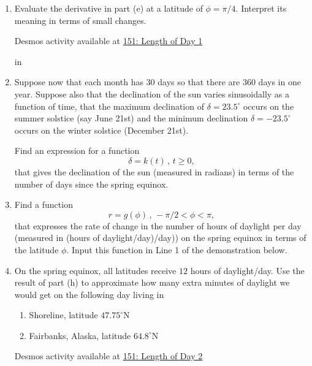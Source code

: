 \documentclass{ximera}
\newcommand{\pskip}{\vskip 0.1 in}
\begin{document}
\begin{question}
\begin{enumerate}
\item Evaluate the derivative in part (e) at a latitude of $\phi =\pi/4$. Interpret its meaning in terms of small changes.

\begin{onlineOnly}
    \begin{center}
\end{center}
\end{onlineOnly}

Desmos activity available at \href{https://www.desmos.com/calculator/ifomatkcta}{151: Length of Day 1}

\pskip 

\item Suppose now that each month has 30 days so that there are 360 days in one year. Suppose also that the declination of the sun varies sinusoidally as a function of time, that the maximum declination of $\delta = 23.5^\circ$ occurs on the summer solstice (say June 21st) and the minimum declination $\delta = -23.5^\circ$ occurs on the winter solstice (December 21st). 

Find an expression for a function
\[
     \delta = k(t) \, , \, t\geq 0,
\]
that gives the declination of the sun (measured in radians) in terms of the number of days since the spring equinox. 

\item Find a function
\[
   r = g(\phi) \, , \, -\pi/2 < \phi < \pi ,
\]
that expresses the rate of change in the number of hours of daylight per day (measured in (hours of daylight/day)/day)) on the spring equinox in terms of the latitude $\phi$. Input this function in Line 1 of the demonstration below.

\item On the spring equinox, all latitudes receive $12$ hours of daylight/day. Use the result of part (h) to approximate how many extra minutes of daylight we would get on the following day living in 

\begin{enumerate}
\item Shoreline, latitude $47.75^\circ$N

\item Fairbanks, Alaska, latitude $64.8^\circ$N

\end{enumerate}

\begin{onlineOnly}
    \begin{center}
\end{center}
\end{onlineOnly}

Desmos activity available at \href{https://www.desmos.com/calculator/nf8n5uphhl}{151: Length of Day 2}

\end{enumerate}

\end{question}
\end{document}
